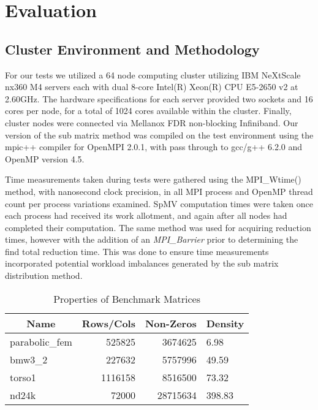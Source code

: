\section{Evaluation}\label{sec:dspmv-evaluation}

\subsection{Cluster Environment and Methodology}

For our tests we utilized a 64 node computing cluster utilizing IBM NeXtScale nx360 M4 servers each with dual 8-core Intel(R) Xeon(R) CPU E5-2650 v2 at 2.60GHz. 
The hardware specifications for each server provided two sockets and 16 cores per node, for a total of 1024 cores available within the cluster. 
Finally, cluster nodes were connected via Mellanox FDR non-blocking Infiniband. Our version of the sub matrix method was compiled on the test environment using the mpic++ compiler for OpenMPI 2.0.1, with pass through to gcc/g++ 6.2.0 and OpenMP version 4.5. 

Time measurements taken during tests were gathered using the MPI\_Wtime() method, with nanosecond clock precision, in all MPI process and OpenMP thread count per process variations examined. 
SpMV computation times were taken once each process had received its work allotment, and again after all nodes had completed their computation. 
The same method was used for acquiring reduction times, however with the addition of an \emph{MPI\_Barrier} prior to determining the find total reduction time. 
This was done to ensure time measurements incorporated potential workload imbalances generated by the sub matrix distribution method.

\begin{table}[]
	\centering
	\caption{Properties of Benchmark Matrices}
	\label{matrix-properties}
	\begin{tabular}{lrrl}
		\hline
		\multicolumn{1}{|c|}{\textbf{Name}} & \multicolumn{1}{c|}{\textbf{Rows/Cols}} & \multicolumn{1}{c|}{\textbf{Non-Zeros}} & \multicolumn{1}{l|}{\textbf{Density}} \\ \hline
		parabolic\_fem                      & 525825                             & 3674625                                 & 6.98                                   \\
		bmw3\_2                             & 227632                             & 5757996                                 & 49.59                                  \\
		torso1                              & 1116158                            & 8516500                                 & 73.32                                  \\
		nd24k                               & 72000                              & 28715634                                & 398.83                            
	\end{tabular}
\end{table}

